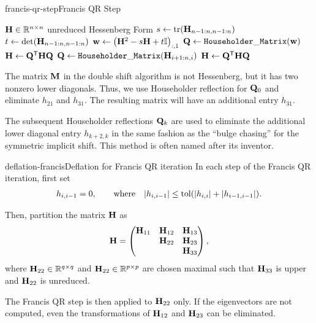 \begin{Algorithm*}{francis-qr-step}{Francis QR Step}
  \begin{algorithmic}[1]
    \Require \( \mathbf H \in \mathbb R^{n\times n}\) unreduced Hessenberg Form
    \State \( s \gets \operatorname{tr}(\mathbf H_{n-1:n, n-1:n})\)
    \State \( t \gets \det(\mathbf H_{n-1:n, n-1:n})\)
    \State \(\mathbf w \gets \left(\mathbf H^2 - s \mathbf H + t \mathbb I\right)_{:,1}\)
    \State \(\mathbf Q \gets \mathtt{Householder\_Matrix}(\mathbf w)\)
    \State \( \mathbf H \gets \mathbf Q^\mathsf{T} \mathbf H \mathbf Q\)
      \State \(\mathbf Q \gets \mathtt{Householder\_Matrix}(\mathbf H_{i+1:n,i})\)
      \State \( \mathbf H \gets \mathbf Q^\mathsf{T} \mathbf H \mathbf Q\)
    \EndFor
  \end{algorithmic}
\end{Algorithm*}

\begin{remark}
  The matrix $\mathbf M$ in the double shift algorithm is not Hessenberg,
  but it has two nonzero lower diagonals. Thus, we use Householder
  reflection for $\mathbf Q_0$ and eliminate $h_{21}$ and $h_{31}$. The
  resulting matrix will have an additional entry $h_{31}$.

  The subsequent Householder reflections $\mathbf Q_k$ are used to
  eliminate the additional lower diagonal entry $h_{k+2,k}$ in the
  same fashion as the ``bulge chasing'' for the symmetric implicit
  shift. This method is often named  after its
  inventor.
\end{remark}

\begin{Algorithm*}{deflation-francis}{Deflation for Francis QR iteration}
  In each step of the Francis QR iteration, first set
  \begin{gather}
    h_{i,i-1} = 0, \qquad \text{where}\quad
    \lvert h_{i,i-1}\rvert \le \text{tol} (\lvert h_{i,i}\rvert+\lvert h_{i-1,i-1}\rvert).
  \end{gather}

  Then, partition the matrix
  $\mathbf H$ as
  \begin{gather}
    \mathbf H =
    \begin{pmatrix}
      \mathbf H_{11} & \mathbf H_{12} & \mathbf H_{13} \\
      & \mathbf H_{22} & \mathbf H_{23}\\
      && \mathbf H_{33}
    \end{pmatrix},
  \end{gather}
  where $\mathbf H_{22}\in\mathbb R^{q\times q}$ and
  $\mathbf H_{22}\in\mathbb R^{p\times p}$ are chosen maximal such that
  $\mathbf H_{33}$ is upper  and $\mathbf H_{22}$
  is unreduced.

  The Francis QR step is then applied to $\mathbf H_{22}$ only. If the
  eigenvectors are not computed, even the transformations of
  $\mathbf H_{12}$ and $\mathbf H_{23}$ can be eliminated.
\end{Algorithm*}

